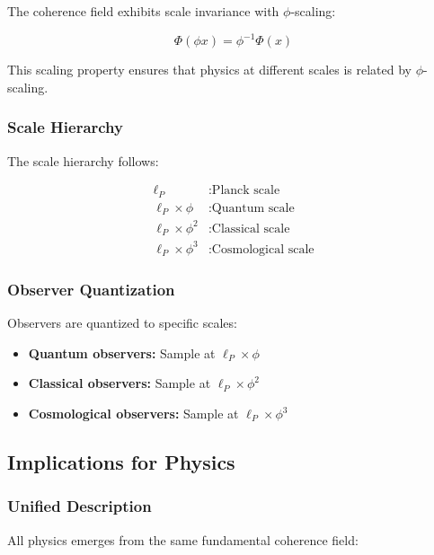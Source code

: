 \documentclass[11pt]{article}
\theoremstyle{definition}
\newcommand{\goldenratio}{\phi}
\begin{document}
The coherence field exhibits scale invariance with $\goldenratio$-scaling:

\begin{equation}
\Phi(\goldenratio x) = \goldenratio^{-1} \Phi(x)
\end{equation}

This scaling property ensures that physics at different scales is related by $\goldenratio$-scaling.

\subsubsection{Scale Hierarchy}

The scale hierarchy follows:

\begin{align}
\ell_P &: \text{Planck scale} \\
\ell_P \times \goldenratio &: \text{Quantum scale} \\
\ell_P \times \goldenratio^2 &: \text{Classical scale} \\
\ell_P \times \goldenratio^3 &: \text{Cosmological scale}
\end{align}

\subsubsection{Observer Quantization}

Observers are quantized to specific scales:

\begin{itemize}
\item \textbf{Quantum observers:} Sample at $\ell_P \times \goldenratio$
\item \textbf{Classical observers:} Sample at $\ell_P \times \goldenratio^2$
\item \textbf{Cosmological observers:} Sample at $\ell_P \times \goldenratio^3$
\end{itemize}

\subsection{Implications for Physics}

\subsubsection{Unified Description}

All physics emerges from the same fundamental coherence field:
\end{document}
